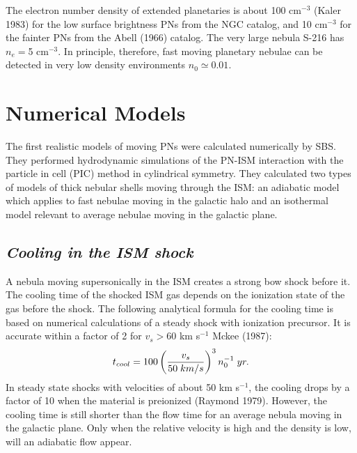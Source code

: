 \documentclass{article}
\begin{document}
\noindent
The electron number density of extended planetaries is about 100 cm$^{-3}$
(Kaler 1983) for the low surface brightness PNs from the NGC catalog,
and 10 cm$^{-3}$ for the fainter PNs from the Abell (1966) catalog.
The very large nebula S-216 has $n_e=$5 cm$^{-3}$.
In principle, therefore, fast moving planetary nebulae can be detected in
very low density environments $n_{0}\simeq 0.01$.

\section{Numerical Models}
\noindent
The first realistic models of moving PNs were calculated numerically by
SBS.  They performed hydrodynamic simulations of the PN-ISM interaction
with the particle in cell (PIC) method in cylindrical symmetry. They
calculated two types of models of thick nebular shells moving through the ISM:
an adiabatic model which applies to fast nebulae moving in the
galactic halo and an isothermal model relevant to average nebulae
moving in the galactic plane.
\noindent

\subsection{\it Cooling in the ISM shock}
A nebula moving supersonically in the ISM creates a strong bow
shock before it. The cooling time of the shocked
ISM gas depends on the ionization state of the gas before
the shock. The following analytical formula for the cooling
time is based on numerical calculations of a steady shock
with ionization precursor. It is accurate within a factor
of 2 for $v_s>$60 km s$^{-1}$  Mckee (1987):
\begin{eqnarray}
t_{cool}=100 \left({v_s\over 50\; km/s}\right)^3 n_{0}^{-1}\; yr.
\end{eqnarray}
In steady state shocks with velocities of about 50 km s$^{-1}$,
the cooling drops by a factor of 10 when the material is preionized
(Raymond 1979). However, the cooling time is still shorter
than the flow time for an average nebula moving in the galactic plane.
Only when the relative velocity is high and the density is low,
will an adiabatic flow appear.
\end{document}
